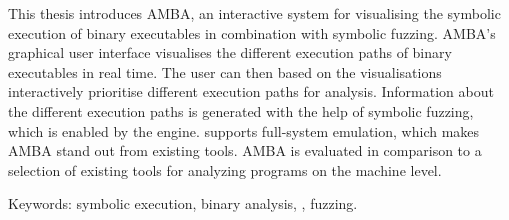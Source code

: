 This thesis introduces AMBA, an interactive system for visualising the symbolic execution of binary executables in combination with symbolic fuzzing.
AMBA's graphical user interface visualises the different execution paths of binary executables in real time.
The user can then based on the visualisations interactively prioritise different execution paths for analysis.
Information about the different execution paths is generated with the help of symbolic fuzzing, which is enabled by the \stoe{} engine.
\stoe{} supports full-system emulation, which makes AMBA stand out from existing tools.
AMBA is evaluated in comparison to a selection of existing tools for analyzing programs on the machine level.

Keywords: symbolic execution, binary analysis, \stoe{}, fuzzing.
